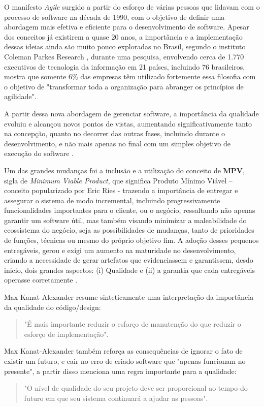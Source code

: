 \documentclass[12pt]{article}
\begin{document}
 O manifesto \textit{Agile} \cite{AGILE_X_LEANMANISFESTOAGILE} surgido a partir do esforço de várias pessoas que lidavam com o processo de software na década de 1990, com o objetivo de definir uma abordagem mais efetiva e eficiente para o desenvolvimento de software. Apesar dos conceitos já existirem a quase 20 anos, a importância e a implementação dessas ideias ainda são muito pouco exploradas no Brasil, segundo o instituto Coleman Parkes Research \cite{COLEMANPARKES_AGILE_2017}, durante uma pesquisa, envolvendo cerca de 1.770 executivos de tecnologia da informação em 21 países, incluindo 76 brasileiros, mostra que somente 6\% das empresas têm utilizado fortemente essa filosofia com o objetivo de "transformar toda a organização para abranger os princípios de agilidade".

 A partir dessa nova abordagem de gerenciar software, a importância da qualidade evoluiu e alcançou novos pontos de vistas, aumentando significativamente tanto na concepção, quanto no decorrer das outras fases, incluindo durante o desenvolvimento, e não mais apenas no final com um simples objetivo de execução do software \cite{WATERFALL_MODEL}.
 
 Um das grandes mudanças foi a inclusão e a utilização do conceito de \textbf{MPV}, sigla de \textit{Minimum Viable Product}, que significa Produto Mínimo Viável – conceito popularizado por Eric Ries \cite{ERICRIES_THELEAN} - trazendo a importância de entregar e assegurar o sistema de modo incremental, incluindo progressivamente funcionalidades importantes para o cliente, ou o negócio, ressaltando não apenas garantir um software útil, mas também visando minimizar a maleabilidade do ecossistema do negócio, seja as possibilidades de mudanças, tanto de prioridades de funções, técnicas ou mesmo do próprio objetivo fim. A adoção desses pequenos entregáveis, gerou e exigi um aumento na maturidade no desenvolvimento, criando a necessidade de gerar artefatos que evidenciassem e garantissem, desdo inicio, dois grandes aspectos: (i) Qualidade e (ii) a garantia que cada entregáveis operasse corretamente \cite{AGILE_WORKING_PROCESS}.

Max Kanat-Alexander \cite{CODE_SIMPLICITY} resume sinteticamente uma interpretação da importância da qualidade do código/design: 
\begin{quote}
 "É mais importante reduzir o esforço de manutenção do que reduzir o esforço de implementação".
\end{quote}

Max Kanat-Alexander \cite{CODE_SIMPLICITY} também reforça as consequências de ignorar o fato de existir um futuro, e cair no erro de criado software que "apenas funcionam no presente", a partir disso menciona uma regra importante para a qualidade: 
\begin{quote}
 "O nível de qualidade do seu projeto deve ser proporcional ao tempo do futuro em que seu sistema continuará a ajudar as pessoas".
\end{quote} 
\end{document}
